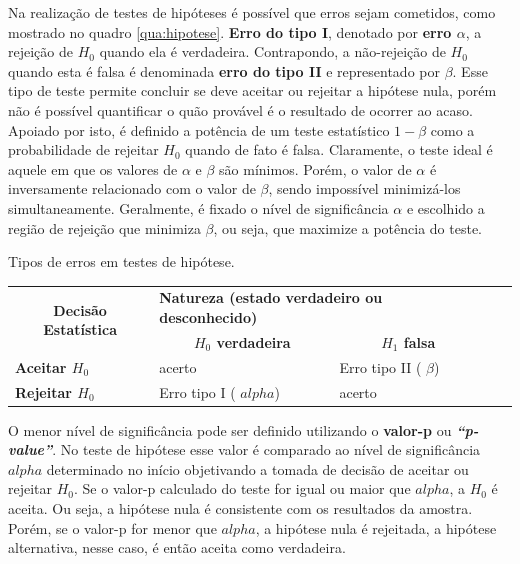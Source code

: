 Na realização de testes de hipóteses é possível que erros sejam cometidos, como mostrado no quadro \ref{qua:hipotese}. \textbf{Erro do tipo I}, denotado por \textbf{erro $\alpha$}, a rejeição de $H_0$ quando ela é verdadeira. Contrapondo, a não-rejeição de $H_0$ quando esta é falsa é denominada \textbf{erro do tipo II} e representado por \textbf{$\beta$}.  Esse tipo de teste permite concluir se deve aceitar ou rejeitar a hipótese nula, porém não é possível quantificar o quão provável é o resultado de ocorrer ao acaso. Apoiado por isto, é definido a potência de um teste estatístico $1-\beta$ como a probabilidade de rejeitar $H_0$ quando de fato é falsa. Claramente, o teste ideal é aquele em que os valores de $\alpha$ e $\beta$ são mínimos. Porém, o valor de $\alpha$ é inversamente relacionado com o valor de $\beta$, sendo impossível minimizá-los simultaneamente. Geralmente, é fixado o nível de significância $\alpha$ e escolhido a região de rejeição que minimiza $\beta$, ou seja, que maximize a potência do teste. 


\begin{quadro}[!htb]
	\centering
	\caption{Tipos de erros em testes de hipótese.\label{qua:hipotese}}
	\begin{tabular}{|l|l|l|ll}
		\cline{1-3}
\multicolumn{1}{|c|}{\multirow{2}{*}{\textbf{Decisão Estatística}}} & \multicolumn{2}{l|}{\textbf{Natureza (estado verdadeiro ou desconhecido)}} &  &  \\ \cline{2-3}
\multicolumn{1}{|c|}{} & \multicolumn{1}{c|}{\textbf{$H_0$ verdadeira}} & \multicolumn{1}{c|}{\textbf{$H_1$ falsa}} &  &  \\ \cline{1-3}
\textbf{Aceitar $H_0$} & acerto & Erro tipo II ( \ensuremath{\beta}) &  &  \\ \cline{1-3}
\textbf{Rejeitar $H_0$} & Erro tipo I ( \ensuremath{alpha}) & acerto &  &  \\ \cline{1-3}
	\end{tabular}
	\fonte{\citeonline{}}
\end{quadro}

O menor nível de significância pode ser definido utilizando o \textbf{valor-p} ou \textbf{\textit{“p-value”}}. No teste de hipótese esse valor é comparado ao nível de significância \ensuremath{alpha} determinado no início objetivando a tomada de decisão de aceitar ou rejeitar $H_0$. Se o valor-p calculado do teste for igual ou maior que \ensuremath{alpha}, a $H_0$ é aceita. Ou seja, a hipótese nula é consistente com os resultados da amostra. Porém, se o valor-p for menor que \ensuremath{alpha}, a hipótese nula é rejeitada, a hipótese alternativa, nesse caso, é então aceita como verdadeira.

